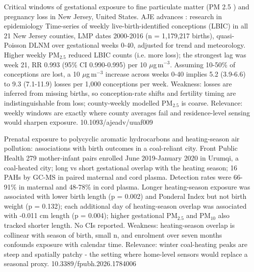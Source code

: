 \documentclass[10pt]{article}
\begin{document}
\par{}\baselineskip{}\baselineskip
{}

{Critical windows of gestational exposure to fine particulate matter (PM 2.5 ) and pregnancy loss in New Jersey, United States.}
{AJE advances : research in epidemiology}
{Time-series of weekly live-birth-identified conceptions (LBIC) in all 21 New Jersey counties, LMP dates 2000-2016 (n = 1,179,217 births), quasi-Poisson DLNM over gestational weeks 0-40, adjusted for trend and meteorology. Higher weekly PM$_{2.5}$ reduced LBIC counts (i.e. more loss); the strongest lag was week 21, RR 0.993 (95\% CI 0.990-0.995) per 10 $\mu$g\,m$^{-3}$. Assuming 10-50\% of conceptions are lost, a 10 $\mu$g\,m$^{-3}$ increase across weeks 0-40 implies 5.2 (3.9-6.6) to 9.3 (7.1-11.9) losses per 1,000 conceptions per week. Weakness: losses are inferred from missing births, so conception-rate shifts and fertility timing are indistinguishable from loss; county-weekly modelled PM$_{2.5}$ is coarse. Relevance: weekly windows are exactly where county averages fail and residence-level sensing would sharpen exposure.}
{10.1093/ajeadv/uuaf009}

{Prenatal exposure to polycyclic aromatic hydrocarbons and heating-season air pollution: associations with birth outcomes in a coal-reliant city.}
{Front Public Health}
{279 mother-infant pairs enrolled June 2019-January 2020 in Urumqi, a coal-heated city; long vs short gestational overlap with the heating season; 16 PAHs by GC-MS in paired maternal and cord plasma. Detection rates were 66-91\% in maternal and 48-78\% in cord plasma. Longer heating-season exposure was associated with lower birth length (p = 0.002) and Ponderal Index but not birth weight (p = 0.132); each additional day of heating-season overlap was associated with -0.011 cm length (p = 0.004); higher gestational PM$_{2.5}$ and PM$_{10}$ also tracked shorter length. No CIs reported. Weakness: heating-season overlap is collinear with season of birth, small n, and enrolment over seven months confounds exposure with calendar time. Relevance: winter coal-heating peaks are steep and spatially patchy - the setting where home-level sensors would replace a seasonal proxy.}
{10.3389/fpubh.2026.1784006}
\end{document}
